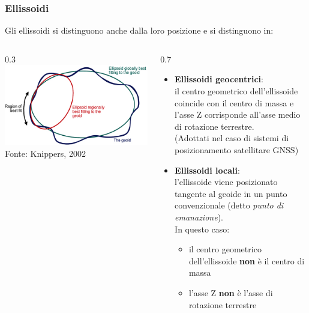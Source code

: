 \documentclass{beamer}
\begin{document}
{\begin{frame}
	\frametitle{Ellissoidi}
	Gli ellissoidi si distinguono anche dalla loro posizione e si distinguono in:
\begin{columns}	
	\begin{column} {0.3\textwidth}
	\includegraphics[width=1\textwidth] {./pics/ellissoide_locale_globale.jpg}	
	\tiny{Fonte: Knippers, 2002}
	\end{column}
	\begin{column} {0.7\textwidth}
		\begin{itemize}
            \item \textbf{Ellissoidi geocentrici}:\\
                {\scriptsize il centro geometrico dell'ellissoide coincide con il centro di massa
                e l'asse Z corrisponde all'asse medio di rotazione terrestre.\\
                (Adottati nel caso di sistemi di posizionamento satellitare GNSS)}
            
			\item \textbf{Ellissoidi locali}:\\
                {\scriptsize l'ellissoide viene posizionato tangente al geoide in un punto 
                convenzionale (detto \textit{punto di emanazione}).\\
                In questo caso:}
                \begin{itemize}
                    \item {\scriptsize il centro geometrico dell'ellissoide \textbf{non} è il centro di massa}
                    \item {\scriptsize l'asse Z \textbf{non} è l'asse di rotazione terrestre}
                \end{itemize}
		\end{itemize}
	\end{column}	
\end{columns}


\end{frame}}
\end{document}
